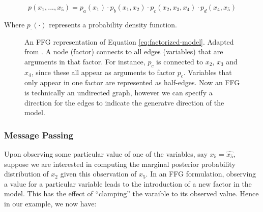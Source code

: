 \documentclass[onecolumn]{IEEEtran}
\begin{document}
\begin{equation}
p(x_1, ..., x_5) = p_a(x_1) \cdot p_b(x_1, x_2) \cdot p_c(x_2, x_3, x_4) \cdot p_d(x_4, x_5) \label{eq:factorized-model}
\end{equation}

Where $p_\cdot(\cdot)$ represents a probability density function.

\begin{figure}[htbp]
  \centering
  \caption{An FFG representation of Equation \ref{eq:factorized-model}. Adapted from \textcite{Factor-Graph-Approach-Automated-Design-Bayesian-Algos}. A node (factor) connects to all edges (variables) that are arguments in that factor. For instance, $p_c$ is connected to $x_2$, $x_3$ and $x_4$, since these all appear as arguments to factor $p_c$. Variables that only appear in one factor are represented as half-edges. Now an FFG is technically an undirected graph, however we can specify a direction for the edges to indicate the generatve direction of the model.}
  \label{fig:factor-graph}
\end{figure}


\vspace{12pt}
\subsubsection{Message Passing}

Upon observing some particular value of one of the variables, say $x_5 = \hat{x_5}$, suppose we are interested in computing the marginal posterior probability distribution of $x_2$ given this observation of $x_5$. In an FFG formulation, observing a value for a particular variable leads to the introduction of a new factor in the model. This has the effect of ``clamping'' the varaible to its observed value. Hence in our example, we now have:
\end{document}
